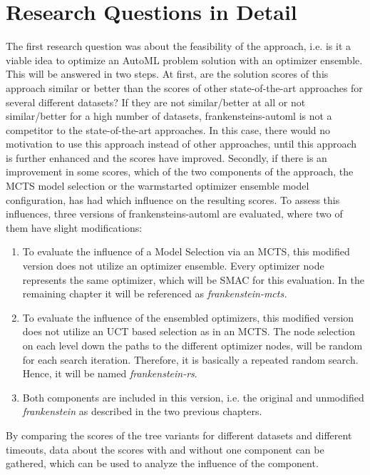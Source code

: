 \section{Research Questions in Detail}
The first research question was about the feasibility of the approach, i.e. is it a viable idea to optimize an AutoML problem solution with an optimizer ensemble.
This will be answered in two steps.\newline
At first, are the solution scores of this approach similar or better than the scores of other state-of-the-art approaches for several different datasets?
If they are not similar/better at all or not similar/better for a high number of datasets, frankensteins-automl is not a competitor to the state-of-the-art approaches.
In this case, there would no motivation to use this approach instead of other approaches, until this approach is further enhanced and the scores have improved.\newline
Secondly, if there is an improvement in some scores, which of the two components of the approach, the MCTS model selection or the warmstarted optimizer ensemble model configuration, has had which influence on the resulting scores.
To assess this influences, three versions of frankensteins-automl are evaluated, where two of them have slight modifications:
\begin{enumerate}
    \item To evaluate the influence of a Model Selection via an MCTS, this modified version does not utilize an optimizer ensemble.
    Every optimizer node represents the same optimizer, which will be SMAC for this evaluation.
    In the remaining chapter it will be referenced as \textit{frankenstein-mcts.}
    \item To evaluate the influence of the ensembled optimizers, this modified version does not utilize an UCT based selection as in an MCTS.
    The node selection on each level down the paths to the different optimizer nodes, will be random for each search iteration.
    Therefore, it is basically a repeated random search.
    Hence, it will be named \textit{frankenstein-rs}.
    \item Both components are included in this version, i.e. the original and unmodified \textit{frankenstein} as described in the two previous chapters.
\end{enumerate}
By comparing the scores of the tree variants for different datasets and different timeouts, data about the scores with and without one component can be gathered, which can be used to analyze the influence of the component.

